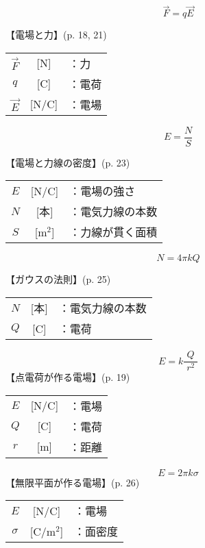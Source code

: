\documentclass[10pt]{jarticle}
\begin{document}
\newpage
\[
\vec{F} = q \vec{E}
\]


\vskip3mm
【電場と力】{\footnotesize (p. 18, 21)}

\begin{tabular}{ccl}
$\vec{F}$	&[N]	&：力 \\
$q$	&[C]	&：電荷 \\
$\vec{E}$	&[N/C]	&：電場
\end{tabular}





\newpage
\[
  E = \frac{N}{S}
\]


\vskip3mm
【電場と力線の密度】{\footnotesize (p. 23)}

\begin{tabular}{ccl}
$E$	&[N/C]	&：電場の強さ \\
$N$	&[本]	&：電気力線の本数 \\
$S$	&[m$^2$]	&：力線が貫く面積
\end{tabular}



\newpage
\[
N = 4\pi k Q
\]


\vskip3mm
【ガウスの法則】{\footnotesize (p. 25)}

\begin{tabular}{ccl}
$N$	&[本]	&：電気力線の本数 \\
$Q$	&[C]	&：電荷
\end{tabular}






\newpage
\[
E = k \frac{Q}{\; r^2 \;}
\]
\vskip3mm
【点電荷が作る電場】{\footnotesize (p. 19)}

\begin{tabular}{ccl}
$E$	&[N/C]	&：電場 \\
$Q$	&[C]	&：電荷 \\
$r$	&[m]	&：距離
\end{tabular}





\newpage
\[
E = 2 \pi k \sigma
\]
\vskip3mm
【無限平面が作る電場】{\footnotesize (p. 26)}

\begin{tabular}{ccl}
$E$	&[N/C]	&：電場 \\
$\sigma$	&[C/m$^2$]	&：面密度
\end{tabular}
\end{document}
